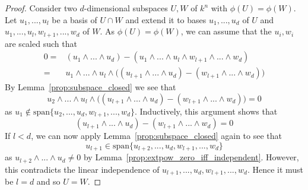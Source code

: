 \documentclass{scrartcl}
\newcommand{\vspan}{\mathrm{span}}
\theoremstyle{definition}
\begin{document}
\begin{proof}
    Consider two $d$-dimensional subspaces $U, W$ of $k^n$ with $\phi(U) = \phi(W)$.
    Let $u_1, ..., u_l$ be a basis of $U \cap W$ and extend it to bases $u_1, ..., u_d$ of $U$ and $u_1, ..., u_l, w_{l + 1}, ..., w_d$ of $W$.
    As $\phi(U) = \phi(W)$, we can assume that the $u_i, w_i$ are scaled such that
    \begin{align*}
        0 =& (u_1 \wedge ... \wedge u_d) - (u_1 \wedge ... \wedge u_l \wedge w_{l + 1} \wedge ... \wedge w_d) \\
        =& u_1 \wedge ... \wedge u_l \wedge \bigl( (u_{l + 1} \wedge ... \wedge u_d) - (w_{l + 1} \wedge ... \wedge w_d) \bigr)
    \end{align*}
    By Lemma~\ref{prop:subspace_closed} we see that
    \begin{equation*}
        u_2 \wedge ... \wedge u_l \wedge \bigl( (u_{l + 1} \wedge ... \wedge u_d) - (w_{l + 1} \wedge ... \wedge w_d) \bigr) = 0
    \end{equation*}
    as $u_1 \notin \vspan\{u_2, ..., u_d, w_{l + 1}, ..., w_d\}$.
    Inductively, this argument shows that
    \begin{equation*}
        (u_{l + 1} \wedge ... \wedge u_d) - (w_{l + 1} \wedge ... \wedge w_d) = 0
    \end{equation*}
    If $l < d$, we can now apply Lemma~\ref{prop:subspace_closed} again to see that
    \begin{equation*}
        u_{l + 1} \in \vspan\{ u_{l + 2}, ..., u_d, w_{l + 1}, ..., w_d \}
    \end{equation*}
    as $u_{l + 2} \wedge ... \wedge u_d \neq 0$ by Lemma~\ref{prop:extpow_zero_iff_independent}.
    However, this contradicts the linear independence of $u_{l + 1}, ..., u_d, w_{l + 1}, ..., w_d$.
    Hence it must be $l = d$ and so $U = W$.
\end{proof}
\end{document}
